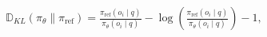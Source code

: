 \documentclass[preview]{standalone}
\begin{document}
\begin{align*}
\mathbb{D}_{KL}( \pi_\theta \| \pi_{\text{ref}} ) =  \frac{\pi_{\text{ref}}(o_i \mid q)}{\pi_\theta(o_i \mid q)} - \log \left( \frac{\pi_{\text{ref}}(o_i \mid q)}{\pi_\theta(o_i \mid q)} \right) - 1,
\end{align*}
\end{document}
